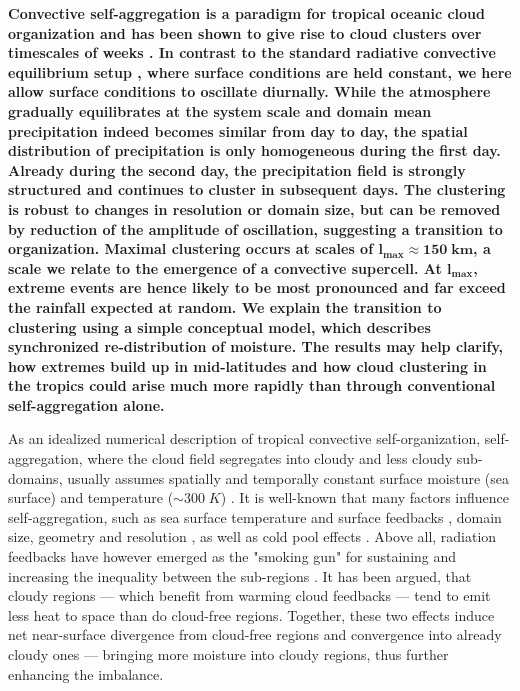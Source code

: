 \documentclass[draft,linenumbers]{agujournal2019}
\begin{document}
\noindent
{\bf Convective self-aggregation is a paradigm for tropical oceanic cloud organization \cite{wing2017convective} and has been shown to give rise to cloud clusters over timescales of weeks \cite{khairoutdinov2010aggregation,muller2012detailed}.
In contrast to the standard radiative convective equilibrium setup \cite{held1993radiative,tompkins1998radiative}, where surface conditions are held constant, we here allow surface conditions to oscillate diurnally.
While the atmosphere gradually equilibrates at the system scale and domain mean precipitation indeed becomes similar from day to day, the spatial distribution of precipitation is only homogeneous during the first day. 
Already during the second day, the precipitation field is strongly structured and continues to cluster in subsequent days.
The clustering is robust to changes in resolution or domain size, but can be removed by reduction of the amplitude of oscillation, suggesting a transition to organization.
Maximal clustering occurs at scales of $\mathbf{l_{max}\approx 150\;km}$, a scale we relate to the emergence of a convective supercell.
At $\mathbf{l_{max}}$, extreme events are hence likely to be most pronounced and far exceed the rainfall expected at random.
We explain the transition to clustering using a simple conceptual model, which describes synchronized re-distribution of moisture. 
The results may help clarify, how extremes build up in mid-latitudes and how cloud clustering in the tropics could arise much more rapidly than through conventional self-aggregation alone.
}


\noindent
As an idealized numerical description of tropical convective self-organization, self-aggregation, where the cloud field segregates into cloudy and less cloudy sub-domains, usually assumes spatially and temporally constant surface moisture (sea surface) and temperature ($\sim 300\;K$) \cite{muller2012detailed}.
It is well-known that many factors influence self-aggregation, such as sea surface temperature and surface feedbacks \cite{hohenegger2016coupled}, domain size, geometry and resolution \cite{muller2015favors}, as well as cold pool effects \cite{jeevanjee2013convective,haerter2019convective}.
Above all, radiation feedbacks have however emerged as the "smoking gun" for sustaining and increasing the inequality between the sub-regions \cite{bretherton2005energy}.
It has been argued, that cloudy regions --- which benefit from warming cloud feedbacks --- tend to emit less heat to space than do cloud-free regions.
Together, these two effects induce net near-surface divergence from cloud-free regions and convergence into already cloudy ones --- bringing more moisture into cloudy regions, thus further enhancing the imbalance.
\end{document}
